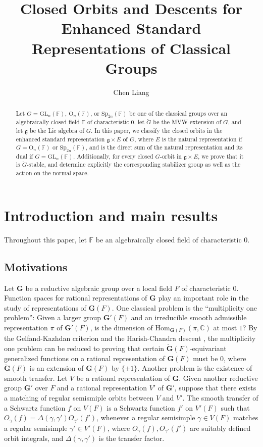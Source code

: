 \documentclass[12pt]{amsart}
\title[Closed orbits and descents]{Closed Orbits and Descents for Enhanced Standard Representations of Classical Groups}
\date{}
\author{Chen Liang}
\theoremstyle{definition}
\theoremstyle{remark}\newtheorem{rmk}[lm]{Remark}
\newcommand{\BC}{{\mathbb {C}}}
\newcommand{\RO}{{\mathrm {O}}}
\newcommand{\GL}{{\mathrm{GL}}}
\newcommand{\Hom}{{\mathrm{Hom}}}
\newcommand{\Sp}{{\mathrm{Sp}}}
\newcommand{\g}{\mathfrak g}
\newcommand{\C}{\mathbb{F}}
\newcommand{\G}{\mathbf{G}}
\begin{document}
	\maketitle
	\begin{abstract} 
    Let $G=\GL_n(\C)$, $\RO_n(\C)$, or $\Sp_{2n}(\C)$ be one of the classical groups over an algebraically closed field $\C$ of characteristic $0$, let $\breve{G}$ be  the MVW-extension  of $G$,  and let $\g$ be the Lie algebra of $G$. 
    In this paper, we classify the closed orbits in the enhanced standard representation $\g\times E$ of $G$, 
    where $E$ is the natural representation if $G=\RO_n(\C)$ or $\Sp_{2n}(\C)$, and is the direct sum of the natural representation and its dual if $G=\GL_n(\C)$.
 Additionally, for every closed $G$-orbit in $\g\times E$, we prove that it is $\breve{G}$-stable, and determine explicitly the corresponding stabilizer group as well as the action on the normal space. 
	\end{abstract}
	\tableofcontents
	\section{Introduction and main results}
    Throughout this paper, let $\C$ be an algebraically closed field of characteristic 0.
    \subsection{Motivations}
Let $\G$ be a reductive algebraic group over a local field $F$ of characteristic $0$.  Function spaces for rational representations of $\G$ play an important role in the study of representations of $\G(F)$. One classical problem is the ``multiplicity one problem'': Given a larger group $\G'(F)$ and an irreducible smooth admissible representation $\pi$ of $\G'(F)$, is the dimension of $\Hom_{\G(F)}(\pi,\BC)$ at most $1$? By the Gelfand-Kazhdan criterion \cite{GK,SZ1} and the Harish-Chandra descent \cite{AG}, the multiplicity one problem can be reduced to proving that certain $\breve{\G}(F)$-equivariant generalized functions on a rational representation of $\G(F)$ must be $0$, where $\breve{\G}(F)$ is an extension of $\G(F)$ by $\{\pm 1\}$. Another problem is the existence of smooth transfer. Let $V$ be a rational representation of $\G$. Given another reductive group $\G'$ over $F$ and a rational representation $V'$ of $\G'$, suppose that there exists a matching of regular semismiple orbits between $V$ and $V'$. The smooth transfer of a Schwartz function $f$ on $V(F)$ is a Schwartz function $f'$ on $V'(F)$ such that $O_{\gamma}(f)=\Delta(\gamma,\gamma')O_{\gamma'}(f')$, whenever a regular semisimple $\gamma\in V(F)$ matches a regular semisimple $\gamma'\in V'(F)$, where $O_{\gamma}(f),O_{\gamma'}(f')$ are suitably defined orbit integrals, and $\Delta(\gamma,\gamma')$ is the transfer factor.
\end{document}
